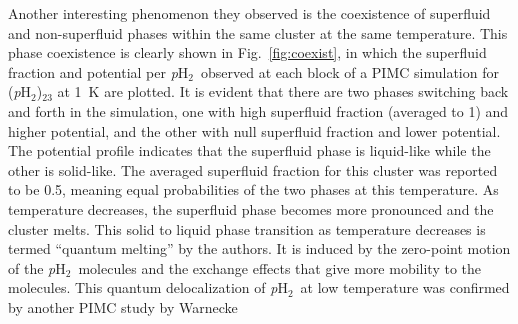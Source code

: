\documentclass[12pt]{iopart}
\newcommand{\phtwo}{{\em p}H$_2$}
\begin{document}
Another interesting phenomenon they observed is the coexistence of superfluid and non-superfluid phases within the same cluster at the same temperature. 
This phase coexistence is clearly shown in Fig.~\ref{fig:coexist}, in which the superfluid fraction and potential per \phtwo~observed at each block of a PIMC simulation for (\phtwo)$_{23}$ at 1~K are plotted. 
It is evident that there are two phases switching back and forth in the simulation, one with high superfluid fraction (averaged to 1) and higher potential, and the other with null superfluid fraction and lower potential. 
The potential profile indicates that the superfluid phase is liquid-like while the other is solid-like. 
The averaged superfluid fraction for this cluster was reported to be 0.5, meaning  equal probabilities of the two phases at this temperature. 
As temperature decreases, the superfluid phase becomes more pronounced and the cluster melts. 
This solid to liquid phase transition as temperature decreases is termed ``quantum melting'' by the authors. 
It is induced by the zero-point motion of the \phtwo~molecules and the exchange effects that give more mobility to the molecules.
This quantum delocalization of \phtwo~at low temperature was confirmed by another PIMC study by Warnecke~\etal~\cite{warnecke_ph2_clusters}
\end{document}
